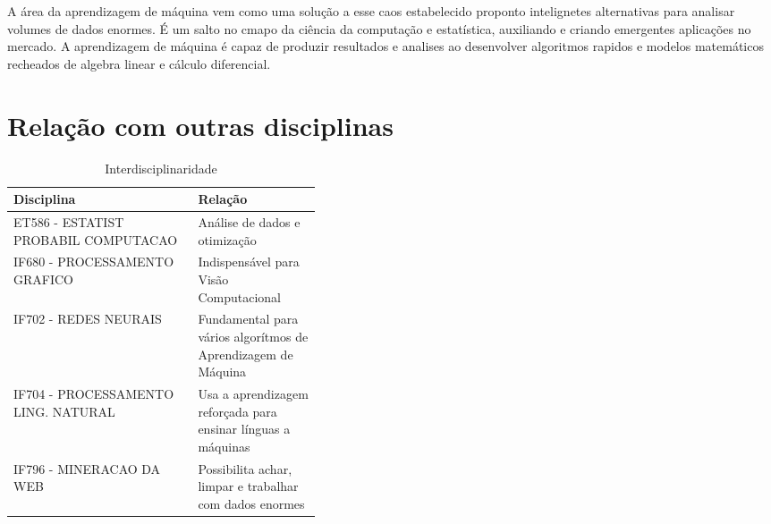 \documentclass[10pt]{article}
\begin{document}
A área da aprendizagem de máquina vem como uma solução a esse caos estabelecido proponto intelignetes alternativas para analisar volumes de dados enormes. É um salto no cmapo da ciência da computação e estatística, auxiliando e criando emergentes aplicações no mercado. A aprendizagem de máquina é capaz de produzir resultados e analises ao desenvolver algoritmos rapidos e modelos matemáticos recheados de algebra linear e cálculo diferencial.
\cite{tom1997learning}

\section{Relação com outras disciplinas}

\begin{table}[h!]
  \begin{center}
    \caption{Interdisciplinaridade \cite{yaser2012learning}}
    \label{tab:table1}
     \begin{tabular}{|l|p{0.4\linewidth}|}
      \textbf{Disciplina} & \textbf{Relação}\\
      \hline
       ET586 - ESTATIST PROBABIL COMPUTACAO & Análise de dados e otimização\newline\hline  \\
       IF680 - PROCESSAMENTO GRAFICO  & Indispensável para Visão  Computacional \hline\\
       IF702 - REDES NEURAIS & Fundamental para vários algorítmos de Aprendizagem de Máquina \hline \\
       IF704 - PROCESSAMENTO LING. NATURAL & Usa a aprendizagem reforçada para ensinar línguas a máquinas \hline \\
       IF796 - MINERACAO DA WEB & Possibilita achar, limpar e trabalhar com dados enormes
    \end{tabular}
  \end{center}
\end{table}




\end{document}
